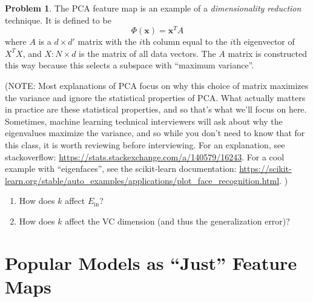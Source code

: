 \documentclass[10pt]{exam}
\theoremstyle{definition}
\newtheorem{problem}{Problem}
\newcommand{\Ein}{E_{\text{in}}}
\newcommand{\trans}[1]{{#1}^{T}}
\newcommand{\x}{\mathbf x}
\begin{document}

%

\newpage
\begin{problem}
    The PCA feature map is an example of a \emph{dimensionality reduction} technique.
    It is defined to be
    \begin{equation}
        \Phi(\x) = \trans\x A
    \end{equation}
    where $A$ is a $d\times d'$ matrix with the $i$th column equal to the $i$th eigenvector of $\trans X X$,
    and $X : N \times d$ is the matrix of all data vectors.
    The $A$ matrix is constructed this way because this selects a subspace with ``maximum variance''.

    (NOTE: Most explanations of PCA focus on why this choice of matrix maximizes the variance and ignore the statistical properties of PCA.
    What actually matters in practice are these statistical properties, and so that's what we'll focus on here.
    Sometimes, machine learning technical interviewers will ask about why the eigenvalues maximize the variance, and so while you don't need to know that for this class, it is worth reviewing before interviewing.  For an explanation, see stackoverflow: \url{https://stats.stackexchange.com/a/140579/16243}.
    For a cool example with ``eigenfaces'', see the scikit-learn documentation:
    \url{https://scikit-learn.org/stable/auto_examples/applications/plot_face_recognition.html}.
    )

    \begin{enumerate}
    \item How does $k$ affect $\Ein$?
        \vspace{3in}
    \item How does $k$ affect the VC dimension (and thus the generalization error)?
        \vspace{3in}
    \end{enumerate}
\end{problem}

\section*{Popular Models as ``Just'' Feature Maps}
\end{document}
